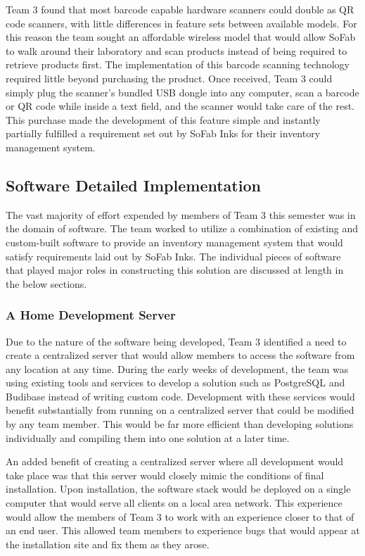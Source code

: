 \documentclass{article}
\begin{document}
Team 3 found that most barcode capable hardware scanners could double as QR code scanners, with little differences in feature sets between
available models. For this reason the team sought an affordable wireless model that would allow SoFab to walk around their laboratory and 
scan products instead of being required to retrieve products first. The implementation of this barcode scanning technology required little
beyond purchasing the product. Once received, Team 3 could simply plug the scanner's bundled USB dongle into any computer, scan a barcode 
or QR code while inside a text field, and the scanner would take care of the rest. This purchase made the development of this 
feature simple and instantly partially fulfilled a requirement set out by SoFab Inks for their inventory management system. 
\subsection{Software Detailed Implementation}
The vast majority of effort expended by members of Team 3 this semester was in the domain of software. The team worked to utilize a 
combination of existing and custom-built software to provide an inventory management system that would satisfy requirements laid out 
by SoFab Inks. The individual pieces of software that played major roles in constructing this solution are discussed at length in the 
below sections.
\subsubsection{A Home Development Server}
Due to the nature of the software being developed, Team 3 identified a need to create a centralized server that would allow members to 
access the software from any location at any time. During the early weeks of development, the team was using existing tools and 
services to develop a solution such as PostgreSQL and Budibase instead of writing custom code. Development with these services would 
benefit substantially from running on a centralized server that could be modified by any team member. This would be far more efficient 
than developing solutions individually and compiling them into one solution at a later time. 

An added benefit of creating a centralized server where all development would take place was that this server would closely mimic the 
conditions of final installation. Upon installation, the software stack would be deployed on a single computer that would serve all 
clients on a local area network. This experience would allow the members of Team 3 to work with an experience closer to that of an end 
user. This allowed team members to experience bugs that would appear at the installation site and fix them as they arose. 
\end{document}
